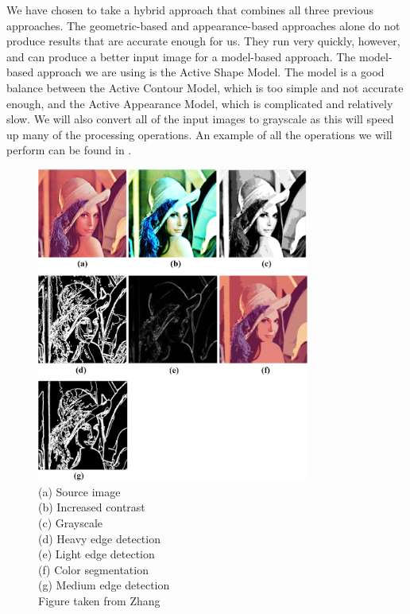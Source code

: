 We have chosen to take a hybrid approach that combines all three previous approaches. The geometric-based and appearance-based approaches alone do not produce results that are accurate enough for us. They run very quickly, however, and can produce a better input image for a model-based approach. The model-based approach we are using is the Active Shape Model. The model is a good balance between the Active Contour Model, which is too simple and not accurate enough, and the Active Appearance Model, which is complicated and relatively slow. We will also convert all of the input images to grayscale as this will speed up many of the processing operations. An example of all the operations we will perform can be found in .

\begin{figure}[p]
    \centering
    \includegraphics[width=0.8\textwidth]{diagrams/lena.png}
    \caption[Image filters]{(a) Source image\\(b) Increased contrast\\(c) Grayscale\\(d) Heavy edge detection\\
	(e) Light edge detection\\(f) Color segmentation\\(g) Medium edge detection\\Figure taken from Zhang\cite{filters}}
    \label{fig:lena}
\end{figure}